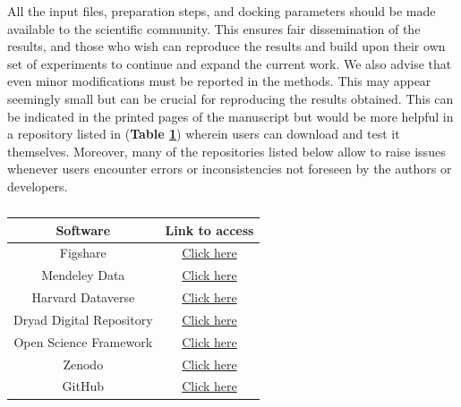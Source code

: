 \documentclass[10pt, a4paper]{book}
\begin{document}
All the input files, preparation steps, and docking parameters should be made available to the scientific community. This ensures fair dissemination of the results, and those who wish can reproduce the results and build upon their own set of experiments to continue and expand the current work. We also advise that even minor modifications must be reported in the methods. This may appear seemingly small but can be crucial for reproducing the results obtained. This can be indicated in the printed pages of the manuscript but would be more helpful in a repository listed in (\textbf{Table \ref{tab:list3}}) wherein users can download and test it themselves. Moreover, many of the repositories listed below allow to raise issues whenever users encounter errors or inconsistencies not foreseen by the authors or developers. 

\begin{table}[ht]
    \centering 
    \caption{{\color{red}{List of repositories for share files in the public domain}}}
    \label{tab:list3}
    \begin{tabular}{|c|c|}
    \hline
         \textbf{Software} &  \textbf{Link to access} \\
    \hline
        Figshare &  \href{https://figshare.com/}{Click here} \\
        Mendeley Data &  \href{https://data.mendeley.com/}{Click here}  \\
        Harvard Dataverse &  \href{https://dataverse.harvard.edu/}{Click here}  \\
        Dryad Digital Repository & \href{https://datadryad.org/stash}{Click here} \\
        Open Science Framework &  \href{https://osf.io/}{Click here}  \\
        Zenodo & \href{https://zenodo.org/}{Click here} \\
        GitHub & \href{https://github.com/}{Click here} \\
    \hline
    \end{tabular}
\end{table}



\end{document}

